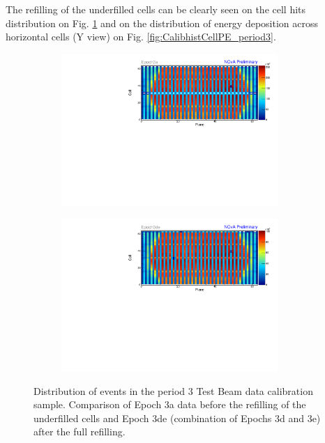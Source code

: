 The refilling of the underfilled cells can be clearly seen on the cell hits distribution on Fig. \ref{fig:Calibhist_period3} and on the distribution of energy deposition across horizontal cells (Y view) on Fig. \ref{fig:CalibhistCellPE_period3}.

\begin{figure}[!hbtp]
\centering
\begin{subfigure}[b]{\textwidth}
\centering
\includegraphics[width=0.9\textwidth]{PlotsTBCalibTechnote/Attenprofs_P3Data_CellPlane_Epoch3a.pdf}
\end{subfigure}
\begin{subfigure}[b]{\textwidth}
\centering
\includegraphics[width=0.9\textwidth]{PlotsTBCalibTechnote/Attenprofs_P3Data_CellPlane_Epoch3de.pdf}
\end{subfigure}
\caption{Distribution of events in the period 3 Test Beam data calibration sample. Comparison of Epoch 3a data before the refilling of the underfilled cells and Epoch 3de (combination of Epochs 3d and 3e) after the full refilling.}
\label{fig:Calibhist_period3}
\end{figure}


